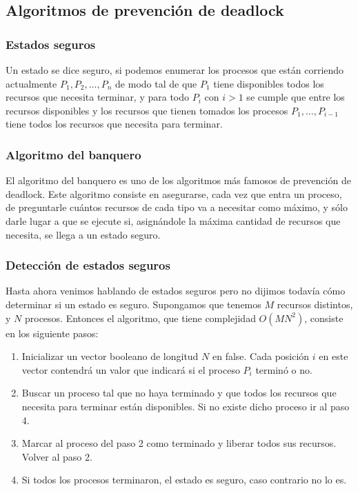 \documentclass{article}
\begin{document}
\subsection{Algoritmos de prevenci\'on de deadlock}

\subsubsection{Estados seguros}

Un estado se dice seguro, si podemos enumerar los procesos que est\'an corriendo actualmente $P_1,P_2,\dots,P_n$ de modo tal de que $P_1$ tiene disponibles todos los recursos que necesita terminar, y para todo $P_i$ con $i > 1$ se cumple que entre los recursos disponibles y los recursos que tienen tomados los procesos $P_1,\dots,P_{i-1}$ tiene todos los recursos que necesita para terminar.

\subsubsection{Algoritmo del banquero}

El algoritmo del banquero es uno de los algoritmos m\'as famosos de prevenci\'on de deadlock. Este algoritmo consiste en asegurarse, cada vez que entra un proceso, de preguntarle cu\'antos recursos de cada tipo va a necesitar como m\'aximo, y s\'olo darle lugar a que se ejecute si, asign\'andole la m\'axima cantidad de recursos que necesita, se llega a un estado seguro.

\subsubsection{Detecci\'on de estados seguros}

Hasta ahora venimos hablando de estados seguros pero no dijimos todav\'ia c\'omo determinar si un estado es seguro. Supongamos que tenemos $M$ recursos distintos, y $N$ procesos. Entonces el algoritmo, que tiene complejidad $O(MN^2)$, consiste en los siguiente pasos:

\begin{enumerate}
\item Inicializar un vector booleano de longitud $N$ en false. Cada posición $i$ en este vector contendrá un valor que indicará si el proceso $P_i$ terminó o no.
\item Buscar un proceso tal que no haya terminado y que todos los recursos que necesita para terminar est\'an disponibles. Si no existe dicho proceso ir al paso 4.
\item Marcar al proceso del paso 2 como terminado y liberar todos sus recursos. Volver al paso 2.
\item Si todos los procesos terminaron, el estado es seguro, caso contrario no lo es.
\end{enumerate}
\end{document}
